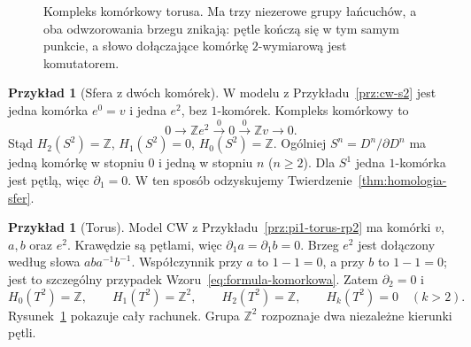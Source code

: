 \documentclass[11pt,a4paper,oneside]{report}
\newcommand{\Z}{\mathbb{Z}}
\theoremstyle{plain}
\theoremstyle{definition}
\newtheorem{przyklad}[twierdzenie]{Przykład}
\theoremstyle{remark}
\begin{document}
\begin{figure}[!htbp]
\centering
{}
\caption{Kompleks komórkowy torusa. Ma trzy
niezerowe grupy łańcuchów, a oba odwzorowania
brzegu znikają: pętle kończą się w tym
samym punkcie, a słowo dołączające
komórkę $2$-wymiarową jest komutatorem.}
\label{fig:kompleks-torusa}
\end{figure}

\begin{przyklad}[Sfera z dwóch komórek]
\label{prz:homologia-cw-sfera}
W modelu z
Przykładu~\ref{prz:cw-s2}
jest jedna komórka $e^0=v$
i jedna $e^2$, bez $1$-komórek.
Kompleks komórkowy to
\[
 0\longrightarrow\Z e^2
 \xrightarrow{\;0\;}0
 \xrightarrow{\;0\;}\Z v
 \longrightarrow0.
\]
Stąd $H_2(S^2)=\Z$, $H_1(S^2)=0$,
$H_0(S^2)=\Z$. Ogólniej
$S^n=D^n/\partial D^n$ ma
jedną komórkę w stopniu $0$
i jedną w stopniu $n$
($n\geq2$). Dla $S^1$
jedna $1$-komórka jest pętlą,
więc $\partial_1=0$.
W ten sposób odzyskujemy
Twierdzenie~\ref{thm:homologia-sfer}.
\end{przyklad}

\begin{przyklad}[Torus]
\label{prz:homologia-cw-torus}
Model CW z
Przykładu~\ref{prz:pi1-torus-rp2}
ma komórki $v$,
$a,b$ oraz $e^2$.
Krawędzie są pętlami, więc
$\partial_1a=\partial_1b=0$.
Brzeg $e^2$ jest dołączony
według słowa $aba^{-1}b^{-1}$.
Współczynnik przy $a$
to $1-1=0$, a przy $b$
to $1-1=0$; jest to
szczególny przypadek
Wzoru~\eqref{eq:formula-komorkowa}.
Zatem $\partial_2=0$ i
\[
 H_0(T^2)=\Z,\qquad
 H_1(T^2)=\Z^2,\qquad
 H_2(T^2)=\Z,\qquad
 H_k(T^2)=0\quad(k>2).
\]
Rysunek~\ref{fig:kompleks-torusa}
pokazuje cały rachunek.
Grupa $\Z^2$ rozpoznaje
dwa niezależne kierunki pętli.
\end{przyklad}
\end{document}
